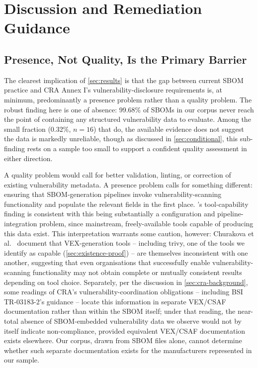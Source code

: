 \documentclass[11pt]{article}
\begin{document}
\section{Discussion and Remediation Guidance}
\label{sec:discussion}

\subsection{Presence, Not Quality, Is the Primary Barrier}

The clearest implication of \cref{sec:results} is that the gap between current SBOM practice and CRA Annex I's vulnerability-disclosure requirements is, at minimum, predominantly a presence problem rather than a quality problem. The robust finding here is one of absence: 99.68\% of SBOMs in our corpus never reach the point of containing any structured vulnerability data to evaluate. Among the small fraction (0.32\%, $n=16$) that do, the available evidence does not suggest the data is markedly unreliable, though as discussed in \cref{sec:conditional}, this sub-finding rests on a sample too small to support a confident quality assessment in either direction.

A quality problem would call for better validation, linting, or correction of existing vulnerability metadata. A presence problem calls for something different: ensuring that SBOM-generation pipelines invoke vulnerability-scanning functionality and populate the relevant fields in the first place. 's tool-capability finding is consistent with this being substantially a configuration and pipeline-integration problem, since mainstream, freely-available tools capable of producing this data exist. This interpretation warrants some caution, however: Churakova et al.\ \cite{churakova2025} document that VEX-generation tools -- including trivy, one of the tools we identify as capable (\cref{sec:existence-proof}) -- are themselves inconsistent with one another, suggesting that even organisations that successfully enable vulnerability-scanning functionality may not obtain complete or mutually consistent results depending on tool choice. Separately, per the discussion in \cref{sec:cra-background}, some readings of CRA's vulnerability-coordination obligations -- including BSI TR-03183-2's guidance \cite{bsi2025} -- locate this information in separate VEX/CSAF documentation rather than within the SBOM itself; under that reading, the near-total absence of SBOM-embedded vulnerability data we observe would not by itself indicate non-compliance, provided equivalent VEX/CSAF documentation exists elsewhere. Our corpus, drawn from SBOM files alone, cannot determine whether such separate documentation exists for the manufacturers represented in our sample.
\end{document}

